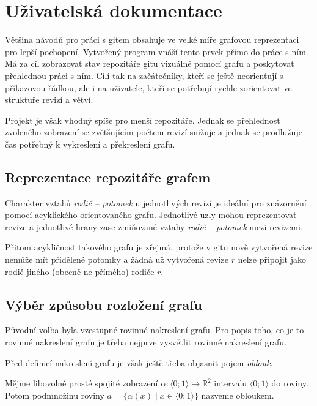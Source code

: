 \documentclass[
  biblatex,
  glossaries,
  index
]{kidiplom}
\begin{document}
\section{Uživatelská dokumentace}
Většina návodů pro práci s gitem obsahuje ve velké míře grafovou reprezentaci pro lepší pochopení. Vytvořený program vnáší tento prvek přímo do práce s ním. Má za cíl zobrazovat stav repozitáře gitu vizuálně pomocí grafu a poskytovat přehlednou práci s ním. Cílí tak na začátečníky, kteří se ještě neorientují s příkazovou řádkou, ale i na uživatele, kteří se potřebují rychle zorientovat ve struktuře revizí a větví.

Projekt je však vhodný spíše pro menší repozitáře. Jednak se přehlednost zvoleného zobrazení se zvětšujícím počtem revizí snižuje a jednak se prodlužuje čas potřebný k vykreslení a překreslení grafu.

\subsection{Reprezentace repozitáře grafem}
Charakter vztahů {\it rodič -- potomek} u jednotlivých revizí je ideální pro znázornění pomocí acyklického orientovaného grafu. Jednotlivé uzly mohou reprezentovat revize a jednotlivé hrany zase zmiňované vztahy {\it rodič -- potomek} mezi revizemi.

Přitom acykličnost takového grafu je zřejmá, protože v gitu nově vytvořená revize nemůže mít přidělené potomky a žádná už vytvořená revize $r$ nelze připojit jako rodič jiného (obecně ne přímého) rodiče $r$.

\subsection{Výběr způsobu rozložení grafu}

Původní volba byla vzestupné rovinné nakreslení grafu. Pro popis toho, co je to rovinné nakreslení grafu je třeba nejprve vysvětlit rovinné nakreslení grafu.

Před definicí nakreslení grafu je však ještě třeba objasnit pojem {\it oblouk}.

\begin{definition}
Mějme libovolné prosté spojité zobrazení $\alpha\colon\langle 0;1\rangle\to\mathbb{R}^2$ intervalu $\langle 0;1\rangle$ do roviny. Potom podmnožinu roviny $a=\{\alpha(x)\mid x\in\langle 0;1\rangle\}$ nazveme obloukem.
\end{definition}
\end{document}

